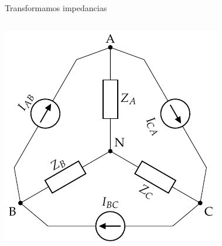 \documentclass[aspectratio=169, usenames,svgnames,dvipsnames]{beamer}
\begin{document}
\begin{frame}[label={sec:org10a8534}]{Transformamos impedancias}
\begin{columns}
\begin{column}{0.5\columnwidth}
\begin{center}
\includegraphics[width=\textwidth]{../figs/GeneradorRealTriangulo_I_ZEstrella.pdf}
\end{center}
\end{column}
\end{columns}
\end{frame}
\end{document}
